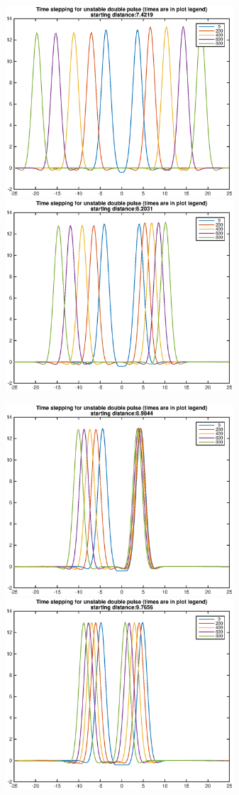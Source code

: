 \documentclass[12pt]{article}
\begin{document}
\begin{figure}[H]
	\includegraphics[width=8.5cm]{2double1_dist1.eps}
	\includegraphics[width=8.5cm]{2double1_dist2.eps}
\end{figure}
\begin{figure}[H]
	\includegraphics[width=8.5cm]{2double1_dist3.eps}
	\includegraphics[width=8.5cm]{2double1_dist4.eps}
\end{figure}
\end{document}

